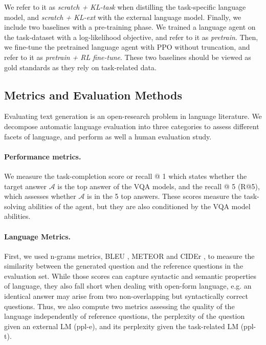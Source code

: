 \documentclass{article}
\newcommand{\answer}{\mathcal{A}}
\begin{document}
We refer to it as \textit{scratch + KL-task} when distilling the task-specific language model, and \textit{scratch + KL-ext} with the external language model.
Finally, we include two baselines with a pre-training phase. We trained a language agent on the task-dataset with a log-likelihood objective, and refer to it as \textit{pretrain}. Then, we fine-tune the pretrained language agent with PPO without truncation, and refer to it as \textit{pretrain + RL fine-tune}. These two baselines should be viewed as gold standards as they rely on task-related data.

\subsection{Metrics and Evaluation Methods}
\label{subsec:evaluation-metrics}

Evaluating text generation is an open-research problem in language literature. 
We decompose automatic language evaluation into three categories to assess different facets of language, and perform as well a human evaluation study. 

\paragraph{Performance metrics.}
We measure the task-completion score or recall @ 1 which states whether the target answer $\answer$ is the top answer of the VQA models, and the recall @ 5 (R@5), which assesses whether $\answer$ is in the 5 top answers. These scores measure the task-solving abilities of the agent, but they are also conditioned by the VQA model abilities.

\paragraph{Language Metrics.}
First, we used n-grams metrics, BLEU \cite{papineni2002bleu}, METEOR \cite{banerjee2005meteor} and CIDEr \cite{vedantam2015cider}, to measure the similarity between the generated question and the reference questions in the evaluation set. While those scores can capture syntactic and semantic properties of language, they also fall short when dealing with open-form language, 
e.g. an identical answer may arise from two non-overlapping but syntactically correct questions. Thus, we also compute two metrics assessing the quality of the language independently of reference questions, the perplexity of the question given an external LM (ppl-e), and its perplexity given the task-related LM (ppl-t). 
\end{document}
